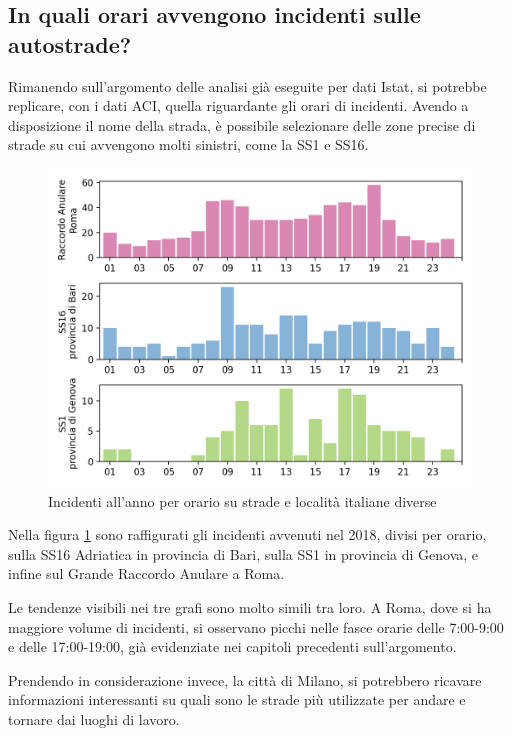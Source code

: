 \documentclass[a4paper,12pt]{report}
\begin{document}
\subsection{In quali orari avvengono incidenti sulle autostrade?}

Rimanendo sull'argomento delle analisi già eseguite per dati Istat, 
si potrebbe replicare, con i dati ACI, quella riguardante gli orari di incidenti. 
Avendo a disposizione il nome della strada, è possibile selezionare delle zone precise 
di strade su cui avvengono molti sinistri, come la SS1 e SS16.

\begin{figure}
    \includegraphics[width=\linewidth]{../src/incidenti/incidenti_aci/orari/orari.png}
    \caption{Incidenti all'anno per orario su strade e località italiane diverse}
    \label{fig:orari-strade-aci}
\end{figure}

Nella figura \ref{fig:orari-strade-aci} sono raffigurati gli incidenti avvenuti 
nel 2018, divisi per orario, sulla SS16 Adriatica in provincia di Bari, sulla SS1 
in provincia di Genova, e infine sul Grande Raccordo Anulare a Roma.

Le tendenze visibili nei tre grafi sono molto simili tra loro. 
A Roma, dove si ha maggiore 
volume di incidenti, si osservano picchi nelle fasce orarie delle 
7:00-9:00 e delle 17:00-19:00, già evidenziate nei capitoli precedenti sull'argomento. 

Prendendo in considerazione invece, la città di Milano, si potrebbero ricavare 
informazioni interessanti su quali sono le strade più utilizzate per 
andare e tornare dai luoghi di lavoro.
\end{document}
